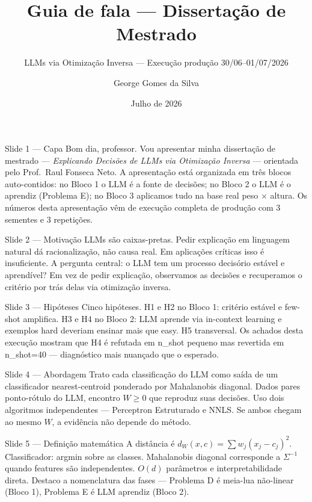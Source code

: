 \documentclass[aspectratio=169,10pt]{beamer}
\title[Guia de fala]{Guia de fala --- Disserta\c{c}\~ao de Mestrado}
\subtitle{LLMs via Otimiza\c{c}\~ao Inversa --- Execu\c{c}\~ao produ\c{c}\~ao 30/06--01/07/2026}
\author{George Gomes da Silva}
\date{Julho de 2026}
\begin{document}

\begin{frame}{Slide 1 --- Capa}
\footnotesize
Bom dia, professor. Vou apresentar minha disserta\c{c}\~ao de mestrado --- \emph{Explicando Decis\~oes de LLMs via Otimiza\c{c}\~ao Inversa} --- orientada pelo Prof.\ Raul Fonseca Neto. A apresenta\c{c}\~ao est\'a organizada em tr\^es blocos auto-contidos: no Bloco 1 o LLM \'e a fonte de decis\~oes; no Bloco 2 o LLM \'e o aprendiz (Problema E); no Bloco 3 aplicamos tudo na base real peso × altura. Os n\'umeros desta apresenta\c{c}\~ao v\^em de execu\c{c}\~ao completa de produ\c{c}\~ao com 3 sementes e 3 repeti\c{c}\~oes.
\end{frame}

\begin{frame}{Slide 2 --- Motiva\c{c}\~ao}
\footnotesize
LLMs s\~ao caixas-pretas. Pedir explica\c{c}\~ao em linguagem natural d\'a racionaliza\c{c}\~ao, n\~ao causa real. Em aplica\c{c}\~oes cr\'iticas isso \'e insuficiente. A pergunta central: o LLM tem um processo decis\'orio est\'avel e aprend\'ivel? Em vez de pedir explica\c{c}\~ao, observamos as decis\~oes e recuperamos o crit\'erio por tr\'as delas via otimiza\c{c}\~ao inversa.
\end{frame}

\begin{frame}{Slide 3 --- Hip\'oteses}
\footnotesize
Cinco hip\'oteses. H1 e H2 no Bloco 1: crit\'erio est\'avel e few-shot amplifica. H3 e H4 no Bloco 2: LLM aprende via in-context learning e exemplos hard deveriam ensinar mais que easy. H5 transversal. Os achados desta execu\c{c}\~ao mostram que H4 \'e refutada em n\_shot pequeno mas revertida em n\_shot=40 --- diagn\'ostico mais nuan\c{c}ado que o esperado.
\end{frame}

\begin{frame}{Slide 4 --- Abordagem}
\footnotesize
Trato cada classifica\c{c}\~ao do LLM como sa\'ida de um classificador nearest-centroid ponderado por Mahalanobis diagonal. Dados pares ponto-r\'otulo do LLM, encontro $W \geq 0$ que reproduz suas decis\~oes. Uso dois algoritmos independentes --- Perceptron Estruturado e NNLS. Se ambos chegam ao mesmo $W$, a evid\^encia n\~ao depende do m\'etodo.
\end{frame}

\begin{frame}{Slide 5 --- Defini\c{c}\~ao matem\'atica}
\footnotesize
A dist\^ancia \'e $d_W(x,c) = \sum w_j (x_j - c_j)^2$. Classificador: argmin sobre as classes. Mahalanobis diagonal corresponde a $\Sigma^{-1}$ quando features s\~ao independentes. $O(d)$ par\^ametros e interpretabilidade direta. Destaco a nomenclatura das fases --- Problema D \'e meia-lua n\~ao-linear (Bloco 1), Problema E \'e LLM aprendiz (Bloco 2).
\end{frame}
\end{document}
